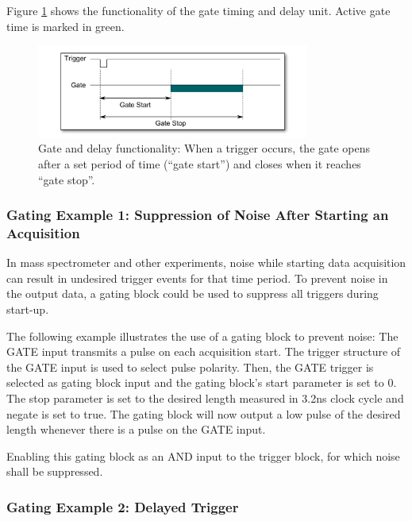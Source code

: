 		Figure \ref{fig:GateUDelay} shows the functionality of the gate timing and delay unit. Active gate time is marked in green.
		
		\begin{figure}[ht]
			\begin{center}
				\includegraphics[width=0.8\textwidth]{figures/GateUDelay.pdf}
				\caption{\label{fig:GateUDelay} Gate and delay functionality: When a trigger occurs, the gate opens after a set period of time (``gate start'') and closes when it reaches ``gate stop''.}
			\end{center}
		\end{figure}
		
		\subsubsection{Gating Example 1: Suppression of Noise After Starting an Acquisition}
			
			In mass spectrometer and other experiments, noise while starting data acquisition can result in undesired trigger events for that time period. To prevent noise in the output data, a gating block could be used to suppress all triggers during start-up.\par
			
			The following example illustrates the use of a gating block to prevent noise: The GATE input transmits a pulse on each acquisition start. The trigger structure of the GATE input is used to select pulse polarity. Then, the GATE trigger is selected as gating block input and the gating block's start parameter is set to 0. The stop parameter is set to the desired length measured in 3.2ns clock cycle and negate is set to true. The gating block will now output a low pulse of the desired length whenever there is a pulse on the GATE input.\par
			
		Enabling this gating block as an AND input to the trigger block, for which noise shall be suppressed.
			
		\subsubsection{Gating Example 2: Delayed Trigger}
		
